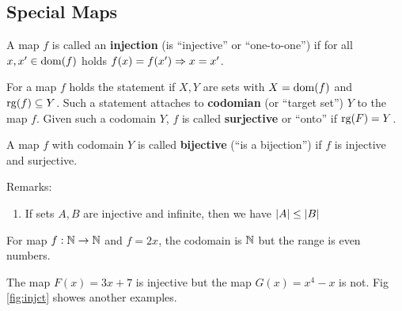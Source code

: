\documentclass[12pt]{book}
\begin{document}
\subsection{Special Maps}
\label{sec:Specialmaps}

\begin{defi}\label{def:inj}
      A map $f$ is called an \textbf{injection} (is ``injective'' or ``one-to-one'') if for all $x, x' \in \operatorname{dom}(f)$ holds $f(x) = f(x') \Rightarrow x = x'$.
\end{defi}
\begin{defi}\label{def:surj}
      For a map $f$ holds the statement  if $X, Y$ are sets with $X = \operatorname{dom}(f)$ and $\operatorname{rg}(f) \subseteq Y$. Such a statement attaches to 
	  \textbf{codomian} (or ``target set'') $Y$ to the map $f$. Given such a codomain $Y$, $f$ is called \textbf{surjective} or ``onto'' if $\operatorname{rg}(F) = Y$.
\end{defi}
\begin{defi}\label{def:bij}
      A map $f$ with codomain $Y$ is called \textbf{bijective} (``is a bijection'') if $f$ is injective and surjective.
\end{defi}
Remarks:
\begin{enumerate}
      \item If sets $A , B$ are injective and infinite, then we have $\lvert A \rvert \leq \lvert B \rvert$
\end{enumerate}
\begin{examp}\label{exp:Specialmaps}
      For map $f: \mathbb{N} \to \mathbb{N}$ and $f=2x$, the codomain is $\mathbb{N}$ but the range is even numbers.
\end{examp}
\begin{examp}\label{exp:Specialmaps}
      The map $F(x) = 3 x + 7$ is injective but the map $G(x) = x^4 - x$ is not. Fig \ref{fig:injct} showes another examples.
\end{examp}
\end{document}
